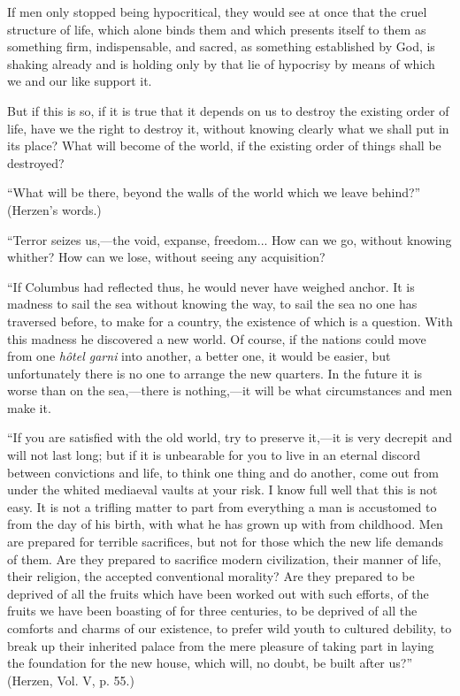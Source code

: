 \documentclass{book}
\begin{document}
If men only stopped being hypocritical, they would see at once that the cruel structure of life, which alone binds them and which presents itself to them as something firm, indispensable, and sacred, as something established by God, is shaking already and is holding only by that lie of hypocrisy by means of which we and our like support it.

But if this is so, if it is true that it depends on us to destroy the existing order of life, have we the right to destroy it, without knowing clearly what we shall put in its place? What will become of the world, if the existing order of things shall be destroyed?

“What will be there, beyond the walls of the world which we leave behind?” (Herzen’s words.)

“Terror seizes us,—the void, expanse, freedom... How can we go, without knowing whither? How can we lose, without seeing any acquisition?

“If Columbus had reflected thus, he would never have weighed anchor. It is madness to sail the sea without knowing the way, to sail the sea no one has traversed before, to make for a country, the existence of which is a question. With this madness he discovered a new world. Of course, if the nations could move from one \emph{hôtel garni} into another, a better one, it would be easier, but unfortunately there is no one to arrange the new quarters. In the future it is worse than on the sea,—there is nothing,—it will be what circumstances and men make it.

“If you are satisfied with the old world, try to preserve it,—it is very decrepit and will not last long; but if it is unbearable for you to live in an eternal discord between convictions and life, to think one thing and do another, come out from under the whited mediaeval vaults at your risk. I know full well that this is not easy. It is not a trifling matter to part from everything a man is accustomed to from the day of his birth, with what he has grown up with from childhood. Men are prepared for terrible sacrifices, but not for those which the new life demands of them. Are they prepared to sacrifice modern civilization, their manner of life, their religion, the accepted conventional morality? Are they prepared to be deprived of all the fruits which have been worked out with such efforts, of the fruits we have been boasting of for three centuries, to be deprived of all the comforts and charms of our existence, to prefer wild youth to cultured debility, to break up their inherited palace from the mere pleasure of taking part in laying the foundation for the new house, which will, no doubt, be built after us?” (Herzen, Vol. V, p. 55.)
\end{document}
